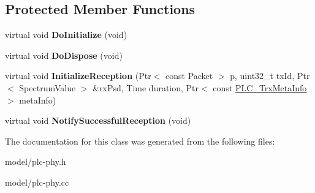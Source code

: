 \subsection*{\-Protected \-Member \-Functions}
\begin{DoxyCompactItemize}
\item 
\hypertarget{classns3_1_1PLC__ChaseCombiningPhy_a97c506d8c8d1aa3a0d5ad87c4b4390e0}{virtual void {\bfseries \-Do\-Initialize} (void)}\label{classns3_1_1PLC__ChaseCombiningPhy_a97c506d8c8d1aa3a0d5ad87c4b4390e0}

\item 
\hypertarget{classns3_1_1PLC__ChaseCombiningPhy_a63f2e7dc5bd8afa62741894b71ba5494}{virtual void {\bfseries \-Do\-Dispose} (void)}\label{classns3_1_1PLC__ChaseCombiningPhy_a63f2e7dc5bd8afa62741894b71ba5494}

\item 
\hypertarget{classns3_1_1PLC__ChaseCombiningPhy_ae411682ccc0a51fa2e99bf222f7a0132}{virtual void {\bfseries \-Initialize\-Reception} (\-Ptr$<$ const \-Packet $>$ p, uint32\-\_\-t tx\-Id, \-Ptr$<$ \-Spectrum\-Value $>$ \&rx\-Psd, \-Time duration, \-Ptr$<$ const \hyperlink{classns3_1_1PLC__TrxMetaInfo}{\-P\-L\-C\-\_\-\-Trx\-Meta\-Info} $>$ meta\-Info)}\label{classns3_1_1PLC__ChaseCombiningPhy_ae411682ccc0a51fa2e99bf222f7a0132}

\item 
\hypertarget{classns3_1_1PLC__ChaseCombiningPhy_ab6099530bb694ab9e6912fc5ff6fef2c}{virtual void {\bfseries \-Notify\-Successful\-Reception} (void)}\label{classns3_1_1PLC__ChaseCombiningPhy_ab6099530bb694ab9e6912fc5ff6fef2c}

\end{DoxyCompactItemize}


\-The documentation for this class was generated from the following files\-:\begin{DoxyCompactItemize}
\item 
model/plc-\/phy.\-h\item 
model/plc-\/phy.\-cc\end{DoxyCompactItemize}
